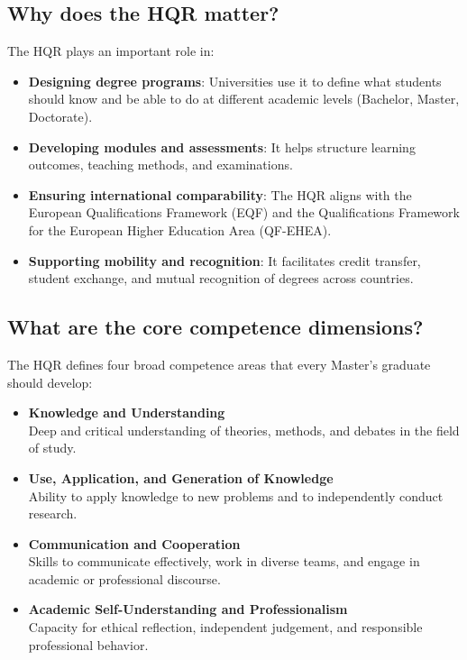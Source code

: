 \documentclass[
  letterpaper,
  10pt,
  openany]{book}
\providecommand{\tightlist}{%
  \setlength{\itemsep}{0pt}\setlength{\parskip}{0pt}}\usepackage{longtable,booktabs,array}
\begin{document}
\subsection*{Why does the HQR matter?}\label{why-does-the-hqr-matter}

The HQR plays an important role in:

\begin{itemize}
\tightlist
\item
  \textbf{Designing degree programs}: Universities use it to define what
  students should know and be able to do at different academic levels
  (Bachelor, Master, Doctorate).
\item
  \textbf{Developing modules and assessments}: It helps structure
  learning outcomes, teaching methods, and examinations.
\item
  \textbf{Ensuring international comparability}: The HQR aligns with the
  European Qualifications Framework (EQF) and the Qualifications
  Framework for the European Higher Education Area (QF-EHEA).
\item
  \textbf{Supporting mobility and recognition}: It facilitates credit
  transfer, student exchange, and mutual recognition of degrees across
  countries.
\end{itemize}

\subsection*{What are the core competence
dimensions?}\label{what-are-the-core-competence-dimensions}

The HQR defines four broad competence areas that every Master's graduate
should develop:

\begin{itemize}
\item
  \textbf{Knowledge and Understanding}\\
  Deep and critical understanding of theories, methods, and debates in
  the field of study.
\item
  \textbf{Use, Application, and Generation of Knowledge}\\
  Ability to apply knowledge to new problems and to independently
  conduct research.
\item
  \textbf{Communication and Cooperation}\\
  Skills to communicate effectively, work in diverse teams, and engage
  in academic or professional discourse.
\item
  \textbf{Academic Self-Understanding and Professionalism}\\
  Capacity for ethical reflection, independent judgement, and
  responsible professional behavior.
\end{itemize}
\end{document}

